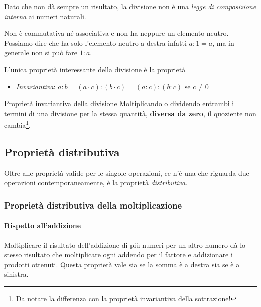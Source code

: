 Dato che non dà sempre un risultato, la divisione non è una 
\emph{legge di composizione interna} ai numeri naturali. 

Non è commutativa né associativa e non ha neppure un elemento neutro.
Possiamo dire che ha solo l'elemento neutro a destra infatti \(a : 1 = a\), 
ma in generale non si può fare \(1 : a\).

L'unica proprietà interessante della divisione è la 
proprietà
\begin{itemize} [noitemsep]
\item \emph{Invariantiva}: 
\(a : b = (a \cdot c) : (b \cdot c) = (a : c) : (b : c) \text{ se } 
c \neq 0\)
\end{itemize}

\begin{definizione}{Proprietà invariantiva della divisione}{}
Moltiplicando o dividendo entrambi i termini di una divisione per 
la stessa quantità, \textbf{diversa da zero}, 
il quoziente non cambia\footnote{
Da notare la differenza con la proprietà invariantiva della sottrazione!}.
\end{definizione}

\subsection{Proprietà distributiva}

Oltre alle proprietà valide per le singole operazioni, ce n'è una che 
riguarda due operazioni contemporaneamente, è la proprietà 
\emph{distributiva}.

\subsubsection{Proprietà distributiva della moltiplicazione}

\paragraph{Rispetto all'addizione}
Moltiplicare il risultato dell'addizione di più numeri per un altro numero 
dà lo stesso risultato che moltiplicare ogni addendo per il fattore e 
addizionare i prodotti ottenuti. Questa proprietà vale sia se la somma è a 
destra sia se è a sinistra.


